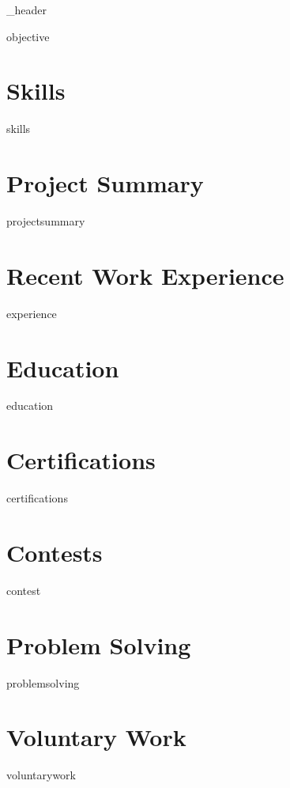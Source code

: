 \documentclass[letter,10pt]{article}
\author{Omar Faruk Pial} %
\begin{document}
{_header}

{objective}
\vspace*{7pt}

\section{Skills}
\vspace*{3pt}
{skills}
\vspace*{7pt}

\section{Project Summary}
\vspace*{3pt}
{projectsummary}
\vspace*{7pt}

\section{Recent Work Experience}
{experience}
\vspace*{7pt}

\section{Education}
{education}
\vspace*{7pt}

\section{Certifications}
{certifications}
\vspace*{7pt}


\section{Contests}
{contest}
\vspace*{7pt}

\section{Problem Solving}
{problemsolving}
\vspace*{7pt}

\section{Voluntary Work}
{voluntarywork}
\vspace*{7pt}
\end{document}
